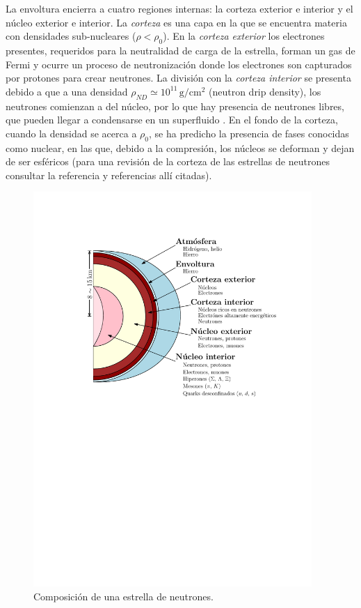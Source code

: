 La envoltura encierra a cuatro regiones internas: la corteza exterior e interior y el núcleo exterior e interior. La \emph{corteza} es una capa en la que se encuentra materia con densidades sub-nucleares ($\rho < \rho_0$). En la \emph{corteza exterior} los electrones presentes, requeridos para la neutralidad de carga de la estrella, forman un gas de Fermi y ocurre un proceso de neutronización donde los electrones son capturados por protones para crear neutrones. La división con la \emph{corteza interior} se presenta debido a que a una densidad $\rho_{ND}\simeq 10^{11}\, \si{\gram\per\centi\metre^2}$ (neutron drip density), los neutrones comienzan a  del núcleo, por lo que hay presencia de neutrones libres, que pueden llegar a condensarse en un superfluido \cite{Baldo2005}. En el fondo de la corteza, cuando la densidad se acerca a $\rho_0$, se ha predicho la presencia de fases conocidas como  nuclear, en las que, debido a la compresión, los núcleos se deforman y dejan de ser esféricos (para una revisión de la corteza de las estrellas de neutrones consultar la referencia \cite{Chamel2008} y referencias allí citadas). 

\begin{figure}[H]
    \centering
    \includegraphics[width=300pt]{figures/neutronstar.pdf}
    \caption{Composición de una estrella de neutrones.\protect\footnotemark}
    \label{NSC}
\end{figure}


